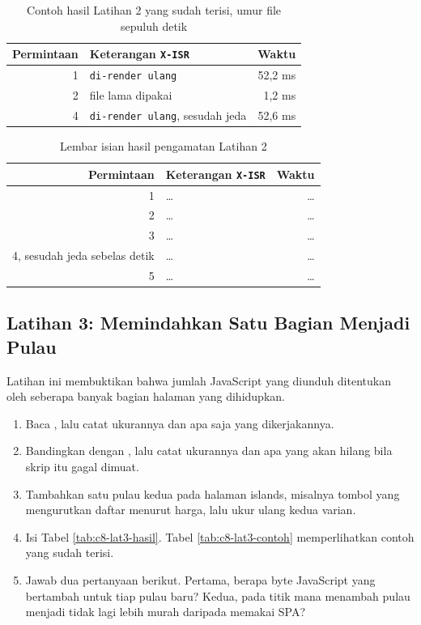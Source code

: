 \begin{table}[!htb]
  \centering
  \caption{Contoh hasil Latihan 2 yang sudah terisi, umur file sepuluh detik}
  \label{tab:c8-lat2-contoh}
  \begin{tabularx}{\textwidth}{rXr}
    \hline
    \textbf{Permintaan} & \textbf{Keterangan \texttt{X-ISR}} & \textbf{Waktu} \\
    \hline
    1 & \texttt{di-render ulang} & 52,2 ms \\
    \hline
    2 & file lama dipakai & 1,2 ms \\
    \hline
    4 & \texttt{di-render ulang}, sesudah jeda & 52,6 ms \\
    \hline
  \end{tabularx}
\end{table}

\begin{table}[!htb]
  \centering
  \caption{Lembar isian hasil pengamatan Latihan 2}
  \label{tab:c8-lat2-hasil}
  \begin{tabularx}{\textwidth}{rXr}
    \hline
    \textbf{Permintaan} & \textbf{Keterangan \texttt{X-ISR}} & \textbf{Waktu} \\
    \hline
    1 & \dots & \dots \\
    \hline
    2 & \dots & \dots \\
    \hline
    3 & \dots & \dots \\
    \hline
    4, sesudah jeda sebelas detik & \dots & \dots \\
    \hline
    5 & \dots & \dots \\
    \hline
  \end{tabularx}
\end{table}

\subsection*{Latihan 3: Memindahkan Satu Bagian Menjadi Pulau}

Latihan ini membuktikan bahwa jumlah JavaScript yang diunduh ditentukan oleh
seberapa banyak bagian halaman yang dihidupkan.

\begin{enumerate}
  \item Baca , lalu catat
        ukurannya dan apa saja yang dikerjakannya.
  \item Bandingkan dengan , lalu
        catat ukurannya dan apa yang akan hilang bila skrip itu gagal
        dimuat.
  \item Tambahkan satu pulau kedua pada halaman islands, misalnya tombol
        yang mengurutkan daftar menurut harga, lalu ukur ulang kedua varian.
  \item Isi Tabel \ref{tab:c8-lat3-hasil}. Tabel \ref{tab:c8-lat3-contoh}
        memperlihatkan contoh yang sudah terisi.
  \item Jawab dua pertanyaan berikut. Pertama, berapa byte JavaScript yang
        bertambah untuk tiap pulau baru? Kedua, pada titik mana menambah
        pulau menjadi tidak lagi lebih murah daripada memakai SPA?
\end{enumerate}

